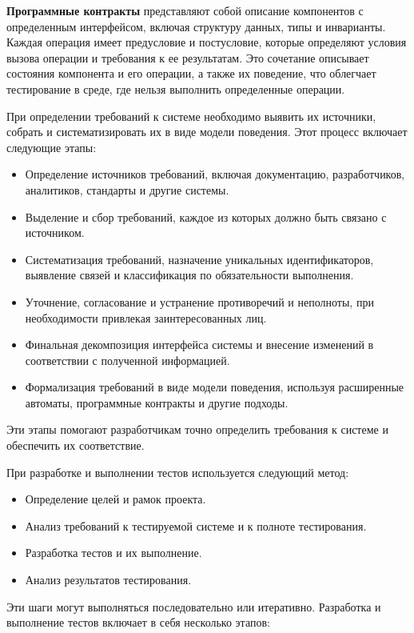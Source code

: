 \textbf{Программные контракты} представляют собой описание компонентов с определенным интерфейсом, включая структуру данных, типы и инварианты. Каждая операция имеет предусловие и постусловие, которые определяют условия вызова операции и требования к ее результатам. Это сочетание описывает состояния компонента и его операции, а также их поведение, что облегчает тестирование в среде, где нельзя выполнить определенные операции.

При определении требований к системе необходимо выявить их источники, собрать и систематизировать их в виде модели поведения. Этот процесс включает следующие этапы:

\begin{itemize}
    \item Определение источников требований, включая документацию, разработчиков, аналитиков, стандарты и другие системы.
    \item Выделение и сбор требований, каждое из которых должно быть связано с источником.
    \item Систематизация требований, назначение уникальных идентификаторов, выявление связей и классификация по обязательности выполнения.
    \item Уточнение, согласование и устранение противоречий и неполноты, при необходимости привлекая заинтересованных лиц.
    \item Финальная декомпозиция интерфейса системы и внесение изменений в соответствии с полученной информацией.
    \item Формализация требований в виде модели поведения, используя расширенные автоматы, программные контракты и другие подходы.

\end{itemize}

Эти этапы помогают разработчикам точно определить требования к системе и обеспечить их соответствие.

При разработке и выполнении тестов используется следующий метод:
\begin{itemize}
    \item Определение целей и рамок проекта.
    \item Анализ требований к тестируемой системе и к полноте тестирования.
    \item Разработка тестов и их выполнение.
    \item Анализ результатов тестирования.
\end{itemize}

Эти шаги могут выполняться последовательно или итеративно. Разработка и выполнение тестов включает в себя несколько этапов:

